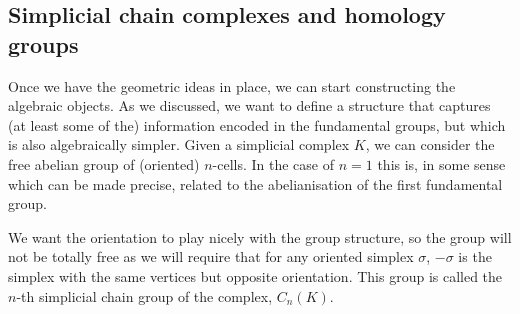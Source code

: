 \documentclass[../main.tex]{subfiles}
\begin{document}
\subsection{Simplicial chain complexes and homology groups}
Once we have the geometric ideas in place, we can start constructing the algebraic
objects. As we discussed, we want to define a structure that captures (at least some of
the) information encoded in the fundamental groups, but which is also algebraically
simpler. Given a simplicial complex \( K \), we can consider the free abelian group of
(oriented) \( n \)-cells. In the case of \( n = 1 \) this is, in some sense which can be
made precise, related to the abelianisation of the first fundamental group. 

We want the orientation to play nicely with the group structure, so the group will not be
totally free as we will require that for any oriented simplex \( \sigma \), \( -\sigma \)
is the simplex with the same vertices but opposite orientation. This group is called the
\( n \)-th simplicial chain group of the complex, \( C_n(K) \). 
\end{document}
